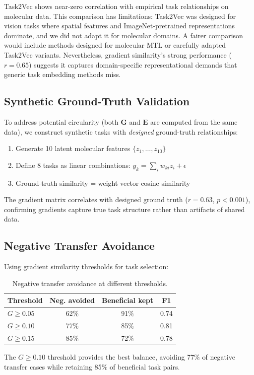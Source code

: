 \documentclass[sigconf,nonacm]{acmart}
\newcommand{\G}{\mathbf{G}}
\newcommand{\E}{\mathbf{E}}
\begin{document}
Task2Vec shows near-zero correlation with empirical task relationships on molecular data. This comparison has limitations: Task2Vec was designed for vision tasks where spatial features and ImageNet-pretrained representations dominate, and we did not adapt it for molecular domains. A fairer comparison would include methods designed for molecular MTL or carefully adapted Task2Vec variants. Nevertheless, gradient similarity's strong performance ($r=0.65$) suggests it captures domain-specific representational demands that generic task embedding methods miss.

\subsection{Synthetic Ground-Truth Validation}

To address potential circularity (both $\G$ and $\E$ are computed from the same data), we construct synthetic tasks with \textit{designed} ground-truth relationships:

\begin{enumerate}[nosep,topsep=2pt]
    \item Generate 10 latent molecular features $\{z_1, \ldots, z_{10}\}$
    \item Define 8 tasks as linear combinations: $y_k = \sum_i w_{ki} z_i + \epsilon$
    \item Ground-truth similarity = weight vector cosine similarity
\end{enumerate}

The gradient matrix correlates with designed ground truth ($r = 0.63$, $p < 0.001$), confirming gradients capture true task structure rather than artifacts of shared data.

\subsection{Negative Transfer Avoidance}

Using gradient similarity thresholds for task selection:

\begin{table}[H]
\caption{Negative transfer avoidance at different thresholds.}
\begin{center}
\begin{tabular}{lccc}
\toprule
Threshold & Neg. avoided & Beneficial kept & F1 \\
\midrule
$G \geq 0.05$ & 62\% & 91\% & 0.74 \\
$G \geq 0.10$ & 77\% & 85\% & 0.81 \\
$G \geq 0.15$ & 85\% & 72\% & 0.78 \\
\bottomrule
\end{tabular}
\end{center}
\end{table}

The $G \geq 0.10$ threshold provides the best balance, avoiding 77\% of negative transfer cases while retaining 85\% of beneficial task pairs.
\end{document}

